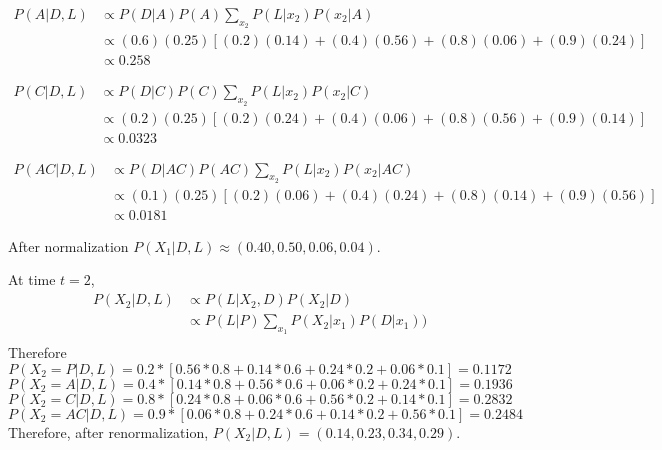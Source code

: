 \documentclass{article}
\begin{document}
\begin{equation}
\begin{split}
P(A|D, L) & \propto P(D|A)P(A) \displaystyle\sum_{x_{2}}P(L|x_{2})P(x_{2}|A) \\
& \propto (0. 6)(0.25) \left[(0.2)(0.14) + (0.4)(0.56) + (0.8)(0.06) + (0.9)(0.24)\right]\\
& \propto 0.258\end{split}
\end{equation}

\begin{equation}
\begin{split}
P(C|D, L) & \propto P(D|C)P(C) \displaystyle\sum_{x_{2}}P(L|x_{2})P(x_{2}|C) \\
& \propto (0. 2)(0.25) \left[(0.2)(0.24) + (0.4)(0.06) + (0.8)(0.56) + (0.9)(0.14)\right]\\
& \propto 0.0323\end{split}
\end{equation}

\begin{equation}
\begin{split}
P(AC|D, L) & \propto P(D|AC)P(AC) \displaystyle\sum_{x_{2}}P(L|x_{2})P(x_{2}|AC) \\
& \propto (0. 1)(0.25) \left[(0.2)(0.06) + (0.4)(0.24) + (0.8)(0.14) + (0.9)(0.56)\right]\\
& \propto 0.0181\end{split}
\end{equation}

After normalization $P(X_{1}|D, L)\approx (0.40, 0.50, 0.06, 0.04)$.

\bigskip
At time $t=2$, 
\begin{equation}
\begin{split}
P(X_{2}|D, L)& \propto P(L|X_{2}, D) P(X_{2}|D) \\
 & \propto P(L|P)\displaystyle\sum_{x_{1}}P(X_{2}|x_{1})P(D|x_{1})) \\ 
\end{split}
\end{equation}
Therefore 
$$P(X_{2}=P|D, L) = 0.2*\left[0.56*0.8 + 0.14*0.6+0.24*0.2 +0.06*0.1\right]=0.1172$$
$$P(X_{2}=A|D, L) = 0.4*\left[0.14*0.8 + 0.56*0.6+0.06*0.2 +0.24*0.1\right]=0.1936$$
$$P(X_{2}=C|D, L) = 0.8*\left[0.24*0.8 + 0.06*0.6+0.56*0.2 +0.14*0.1\right]=0.2832$$
$$P(X_{2}=AC|D, L) = 0.9*\left[0.06*0.8 + 0.24*0.6+0.14*0.2 +0.56*0.1\right]=0.2484$$
Therefore, after renormalization, $P(X_{2}|D, L)=(0.14, 0.23, 0.34, 0.29)$.
\end{document}
